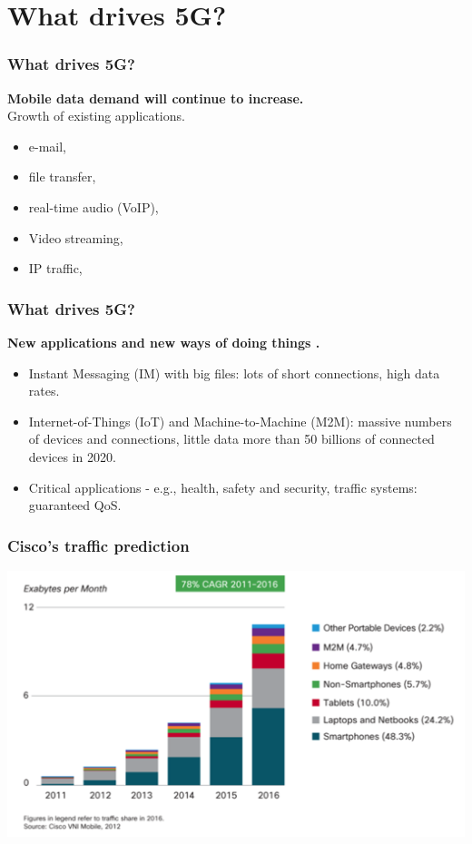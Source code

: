 \documentclass{beamer}
\begin{document}
\section{What drives 5G?}
\begin{frame}
\frametitle{What drives 5G?}


\textbf{Mobile data demand will continue to increase.}\\

Growth of existing applications.\\
\begin{itemize}
\item e-mail,\\ 
\item file transfer,\\ 
\item real-time audio (VoIP),\\ 
\item Video streaming,\\
\item IP traffic,\\ 
\end{itemize}
\end{frame}

\begin{frame}
\frametitle{What drives 5G?}


\textbf{New applications and new ways of doing things
.}\\

\begin{itemize}
\item Instant Messaging (IM) with big files: lots of short connections, high data rates.\\
\item Internet-of-Things (IoT) and Machine-to-Machine (M2M): massive numbers of devices and connections, little data more than 50 billions of connected devices in 2020.\\
\item Critical applications - e.g., health, safety and security, traffic systems: guaranteed QoS.

\end{itemize}
\end{frame}

\begin{frame}
\frametitle{Cisco’s traffic prediction}
\includegraphics[scale=0.5]{cisco}
\end{frame}
\end{document}
